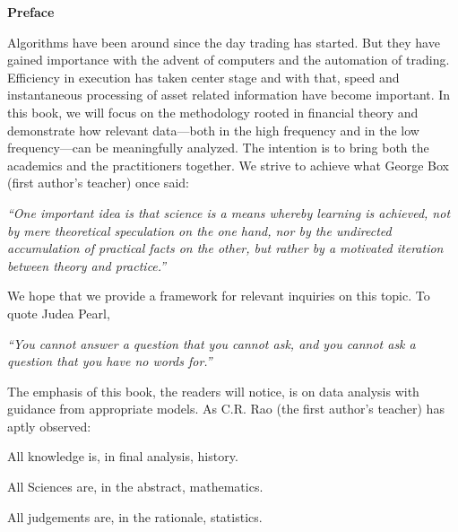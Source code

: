 
\begin{center} {\Large\bfseries Preface} \end{center} \hspace*{\fill}

Algorithms have been around since the day trading has started. But they have gained importance with the advent of computers and the automation of trading. Efficiency in execution has taken center stage and with that, speed and instantaneous processing of asset related information have become important. In this book, we will focus on the methodology rooted in financial theory and demonstrate how relevant data---both in the high frequency and in the low frequency---can be meaningfully analyzed. The intention is to bring both the academics and the practitioners together. We strive to achieve what George Box (first author's teacher) once said: \par
        \begin{center}
        \begin{minipage}[t]{0.7\textwidth}
        	\raggedright
          	{\itshape``One important idea is that science is a means whereby learning is achieved, not by mere theoretical speculation on the one hand, nor by the undirected accumulation of practical facts on the other, but rather by a motivated iteration between theory and practice.''}
        \end{minipage} 
        \end{center}

We hope that we provide a framework for relevant inquiries on this topic. To quote Judea Pearl, \par
        \begin{center}
        \begin{minipage}[t]{0.7\textwidth}
        	\raggedright
          	{\itshape``You cannot answer a question that you cannot ask, and you cannot ask a question that you have no words for.''}
        \end{minipage} 
        \end{center}
The emphasis of this book, the readers will notice, is on data analysis with guidance from appropriate models. As C.R. Rao (the first author's teacher) has aptly observed: \vspace{0.5\baselineskip}

\noindent All knowledge is, in final analysis, history. \par
\noindent All Sciences are, in the abstract, mathematics. \par
\noindent All judgements are, in the rationale, statistics. \twomedskip


